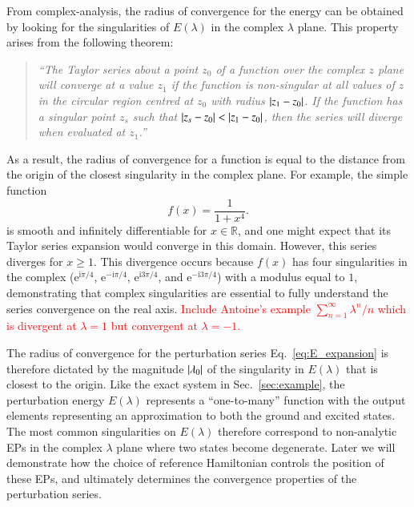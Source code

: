 \documentclass[aps,prb,reprint,noshowkeys,linenumbers,superscriptaddress]{revtex4-1}
\newcommand{\titou}[1]{\textcolor{red}{#1}}
\renewcommand{\i}{\mathrm{i}} %
\newcommand{\e}{\mathrm{e}} %
\begin{document}
From complex-analysis, \cite{BenderBook} the radius of convergence for the energy can be obtained by looking for the 
singularities of $E(\lambda)$ in the complex $\lambda$ plane.
This property arises from the following theorem: \cite{Goodson_2011}
\begin{quote}
\it
``The Taylor series about a point $z_0$ of a function over the complex $z$ plane will converge at a value $z_1$ 
if the function is non-singular at all values of $z$ in the circular region centred at $z_0$ with radius $\abs{z_1-z_0}$. 
If the function has a singular point $z_s$ such that $\abs{z_s-z_0} < \abs{z_1-z_0}$, 
then the series will diverge when evaluated at $z_1$.''
\end{quote}
As a result, the radius of convergence for a function is equal to the distance from the origin of the closest singularity
in the complex plane.
For example, the simple function
\begin{equation} \label{eq:DivExample}
	f(x)=\frac{1}{1+x^4}.
\end{equation}
is smooth and infinitely differentiable for $x \in \mathbb{R}$, and one might expect that its Taylor series expansion would 
converge in this domain.
However, this series diverges for $x \ge 1$.
This divergence occurs because $f(x)$ has four singularities in the complex 
($\e^{\i\pi/4}$, $\e^{-\i\pi/4}$, $\e^{\i3\pi/4}$, and $\e^{-\i3\pi/4}$) with a modulus equal to $1$, demonstrating
that complex singularities are essential to fully understand the series convergence on the real axis.\cite{BenderBook}
\titou{Include Antoine's example $\sum_{n=1}^\infty \lambda^n/n$ which is divergent at $\lambda = 1$ but convergent at $\lambda = -1$.}

The radius of convergence for the perturbation series Eq.~\eqref{eq:E_expansion} is therefore dictated by the magnitude \titou{$\abs{\lambda_0}$} of the
singularity in $E(\lambda)$ that is closest to the origin.
Like the exact system in Sec.~\ref{sec:example}, the perturbation energy $E(\lambda)$ represents
a ``one-to-many'' function with the output elements representing an approximation to both the ground and excited states.
The most common singularities on $E(\lambda)$ therefore correspond to non-analytic EPs in the complex 
$\lambda$ plane where two states become degenerate.
Later we will demonstrate how the choice of reference Hamiltonian controls the position of these EPs, and 
ultimately determines the convergence properties of the perturbation series.

\end{document}
